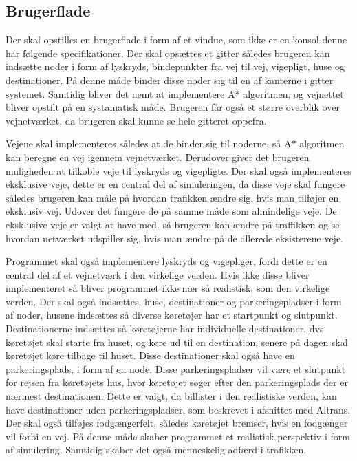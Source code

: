 \vspace{5mm}

\subsection*{Brugerflade}
Der skal opstilles en brugerflade i form af et vindue, som ikke er en konsol denne har følgende specifikationer. Der skal opsættes et gitter således brugeren kan indsætte noder i form af lyskryds, bindepunkter fra vej til vej, vigepligt, huse og destinationer. På denne måde binder disse noder sig til en af kanterne i gitter systemet. Samtidig bliver det nemt at implementere A* algoritmen, og vejnettet bliver opstilt på en systamatisk måde. Brugeren får også et større overblik over vejnetværket, da brugeren skal kunne se hele gitteret oppefra.

\vspace{5mm}

Vejene skal implementeres således at de binder sig til noderne, så A* algoritmen kan beregne en vej igennem vejnetværket. Derudover giver det brugeren muligheden at tilkoble veje til lyskryds og vigepligte. Der skal også implementeres eksklusive veje, dette er en central del af simuleringen, da disse veje skal fungere således brugeren kan måle på hvordan trafikken ændre sig, hvis man tilføjer en eksklusiv vej. Udover det fungere de på samme måde som almindelige veje. De eksklusive veje er valgt at have med, så brugeren kan ændre på traffikken og se hvordan netværket udspiller sig, hvis man ændre på de allerede eksisterene veje.

\vspace{5mm}

Programmet skal også implementere lyskryds og vigepliger, fordi dette er en central del af et vejnetværk i den virkelige verden. Hvis ikke disse bliver implementeret så bliver programmet ikke nær så realistisk, som den virkelige verden. Der skal også indsættes, huse, destinationer og parkeringspladser i form af noder, husene indsættes så diverse køretøjer har et startpunkt og slutpunkt. Destinationerne indsættes så køretøjerne har individuelle destinationer, dvs køretøjet skal starte fra huset, og køre ud til en destination, senere på dagen skal køretøjet køre tilbage til huset. Disse destinationer skal også have en parkeringsplads, i form af en node. Disse parkeringspladser vil være et slutpunkt for rejsen fra køretøjets hus, hvor køretøjet søger efter den parkeringsplads der er nærmest destinationen. Dette er valgt, da billister i den realistiske verden, kan have destinationer uden parkeringspladser, som beskrevet i afsnittet med Altrans. Der skal også tilføjes fodgængerfelt, således køretøjet bremser, hvis en fodgænger vil forbi en vej. På denne måde skaber programmet et realistisk perspektiv i form af simulering. Samtidig skaber det også menneskelig adfærd i trafikken.

